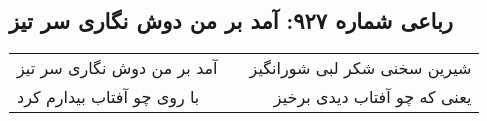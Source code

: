 \begin{center}
\section*{رباعی شماره ۹۲۷: آمد بر من دوش نگاری سر تیز}
\label{sec:0927}
\begin{longtable}{l p{0.5cm} r}
آمد بر من دوش نگاری سر تیز
&&
شیرین سخنی شکر لبی شورانگیز
\\
با روی چو آفتاب بیدارم کرد
&&
یعنی که چو آفتاب دیدی برخیز
\\
\end{longtable}
\end{center}
